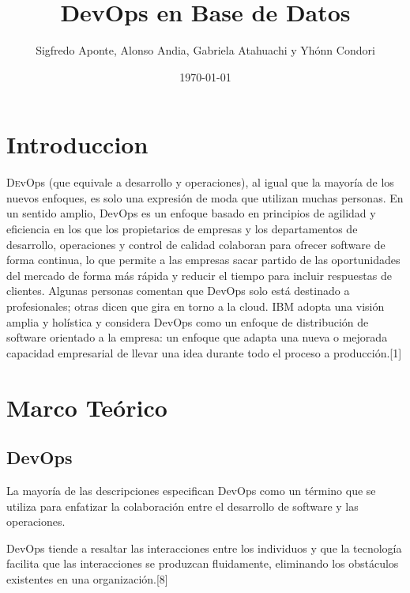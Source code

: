 \documentclass[twoside,twocolumn]{article}
\title{DevOps en Base de Datos} %
\author{Sigfredo Aponte, Alonso Andia, Gabriela Atahuachi y Yhónn Condori}
\date{\today} %
\begin{document}
\maketitle
\section{Introduccion}
\lettrine[nindent=0em,lines=3]{D}evOps (que equivale a desarrollo y operaciones), al igual que la mayoría de los nuevos enfoques, es solo una expresión de moda que utilizan muchas personas. En un sentido amplio, DevOps es un enfoque basado en principios de agilidad y eficiencia en los que los propietarios de empresas y los departamentos de desarrollo, operaciones y control de calidad colaboran para ofrecer software de forma continua, lo que permite a las empresas sacar partido de las oportunidades del mercado de forma más rápida y reducir el tiempo para incluir respuestas de clientes.
Algunas personas comentan que DevOps solo está destinado a profesionales; otras dicen que gira en torno a la cloud. IBM adopta una visión amplia y holística y considera DevOps como un enfoque de distribución de software orientado a la empresa: un enfoque que adapta una nueva o mejorada capacidad empresarial de llevar una idea durante todo el proceso a producción.[1] 




\section{Marco Teórico}

\subsection{DevOps}

La mayoría de las descripciones especifican DevOps como un término que se utiliza para enfatizar la colaboración entre el desarrollo de software y las operaciones.

DevOps tiende a resaltar las interacciones entre los individuos y que la tecnología facilita que las interacciones se produzcan fluidamente, eliminando los obstáculos existentes en una organización.[8]
\end{document}
